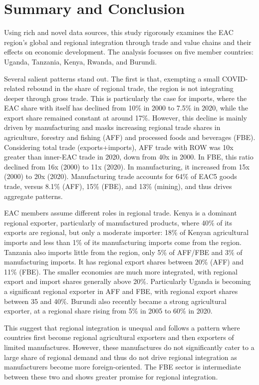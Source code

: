 \documentclass[a4paper]{article}
\begin{document}
\section{Summary and Conclusion} 

Using rich and novel data sources, this study rigorously examines the EAC region's global and regional integration through trade and value chains and their effects on economic development. The analysis focusses on five member countries: Uganda, Tanzania, Kenya, Rwanda, and Burundi. \newline

Several salient patterns stand out. The first is that, exempting a small COVID-related rebound in the share of regional trade, the region is not integrating deeper through gross trade. This is particularly the case for imports, where the EAC share with itself has declined from 10\% in 2000 to 7.5\% in 2020, while the export share remained constant at around 17\%. However, this decline is mainly driven by manufacturing and masks increasing regional trade shares in agriculture, forestry and fishing (AFF) and processed foods and beverages (FBE). Considering total trade (exports+imports), AFF trade with ROW was 10x greater than inner-EAC trade in 2020, down from 40x in 2000. In FBE, this ratio declined from 16x (2000) to 11x (2020). In manufacturing, it increased from 15x (2000) to 20x (2020). Manufacturing trade accounts for 64\% of EAC5 goods trade, versus  8.1\% (AFF), 15\% (FBE), and 13\% (mining), and thus drives aggregate patterns. \newline 

EAC members assume different roles in regional trade. Kenya is a dominant regional exporter, particularly of manufactured products, where 40\% of its exports are regional, but only a moderate importer: 18\% of Kenyan agricultural imports and less than 1\% of its manufacturing imports come from the region. Tanzania also imports little from the region, only 5\% of AFF/FBE and 3\% of manufacturing imports. It has regional export shares between 20\% (AFF) and 11\% (FBE). The smaller economies are much more integrated, with regional export and import shares generally above 20\%. Particularly Uganda is becoming a significant regional exporter in AFF and FBE, with regional export shares between 35 and 40\%. Burundi also recently became a strong agricultural exporter, at a regional share rising from 5\% in 2005 to 60\% in 2020. \newline

This suggest that regional integration is unequal and follows a pattern where countries first become regional agricultural exporters and then exporters of limited manufactures. However, these manufactures do not significantly cater to a large share of regional demand and thus do not drive regional integration as manufacturers become more foreign-oriented. The FBE sector is intermediate between these two and shows greater promise for regional integration. \newline
\end{document}
